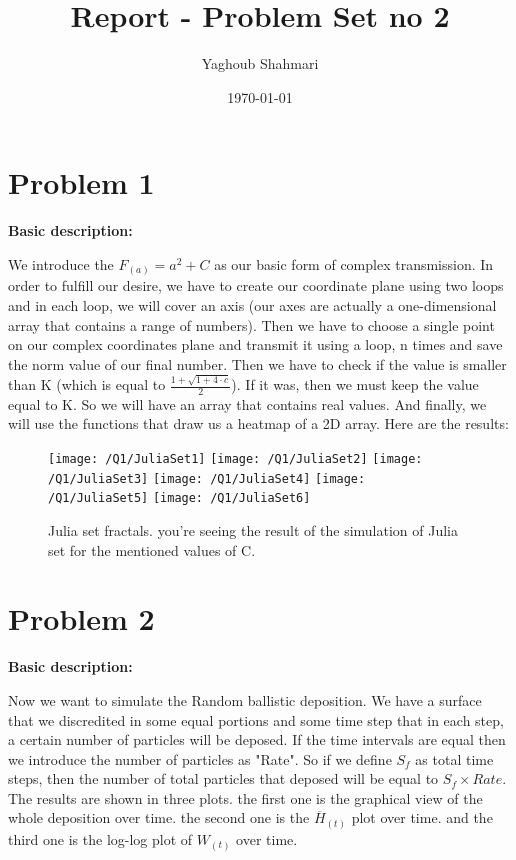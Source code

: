 \documentclass{article}
\author{Yaghoub Shahmari}
\title{Report - Problem Set no 2}
\date{\today}
\begin{document}
    \maketitle
    \section*{Problem 1}
    \textbf{Basic description:}

    We introduce the $F_{(a)}=a^{2}+C$ as our basic form of complex transmission.
    In order to fulfill our desire,
    we have to create our coordinate plane using two loops and in each loop,
    we will cover an axis (our axes are actually a one-dimensional array that
    contains a range of numbers). Then we have to choose a single point on our
    complex coordinates plane and transmit it using a loop, n times and save
    the norm value of our final number. Then we have to check if the value is
    smaller than K (which is equal to $\frac{1+\sqrt{1+4 \cdot c}}{2}$). If it was, then we must keep the
    value equal to K. So we will have an array that contains real values.
    And finally,
    we will use the functions that draw us a heatmap of a 2D array.
    Here are the results:

    \begin{figure}[!htb]
        \centering
        \texttt{[image: /Q1/JuliaSet1]}
        \label{fig:1.1}
        \texttt{[image: /Q1/JuliaSet2]}
        \label{fig:1.2}
        \texttt{[image: /Q1/JuliaSet3]}
        \label{fig:1.3}
        \texttt{[image: /Q1/JuliaSet4]}
        \label{fig:1.4}
        \texttt{[image: /Q1/JuliaSet5]}
        \label{fig:1.5}
        \texttt{[image: /Q1/JuliaSet6]}
        \label{fig:1.6}
        \caption{Julia set fractals. you're seeing the result of the simulation of Julia set for
        the mentioned values of C.}
    \end{figure}

    \pagebreak
    
    \section*{Problem 2}
    \textbf{Basic description:}

    Now we want to simulate the Random ballistic deposition.
    We have a surface that we discredited in some equal portions
    and some time step that in each step,
    a certain number of particles will be deposed.
    If the time intervals are equal then we introduce
    the number of particles as "Rate". So if we define $S_{f}$
    as total time steps, then the number of total particles
    that deposed will be equal to $S_{f}\times Rate$. The results are shown in three plots.
    the first one is the graphical view of the whole deposition over time.
    the second one is the $\overline{H}_{(t)}$ plot over time. and the third one is
    the log-log plot of $W_{(t)}$ over time.
\end{document}
